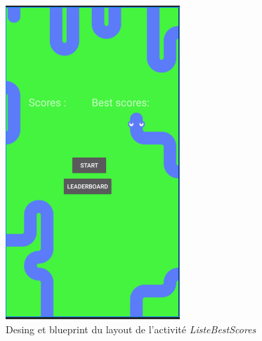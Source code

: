 \documentclass{article}
\begin{document}
\begin{figure}[H]
    \centering
    \begin{minipage}[c]{.3\linewidth}
        \centering
        \includegraphics[scale=0.52]{Menu.png}
        \caption{Desing et blueprint du layout de l'activité \textit{ListeBestScores}}
        \label{fig:DLBS}
    \end{minipage} \hfill
    \begin{minipage}[c]{.3\linewidth}
        \centering

\end{minipage}
\end{figure}
\end{document}
